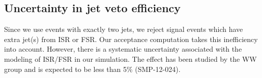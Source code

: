 \subsection{Uncertainty in jet veto efficiency}
Since we use events with exactly two jets, we reject signal events 
which have extra jet(s) from ISR or FSR. Our acceptance computation 
takes this inefficiency into account. However, there is a 
systematic uncertainty associated with the modeling of 
ISR/FSR in our simulation. The effect has been studied by the WW group and is expected to be less than 5\% (SMP-12-024).

